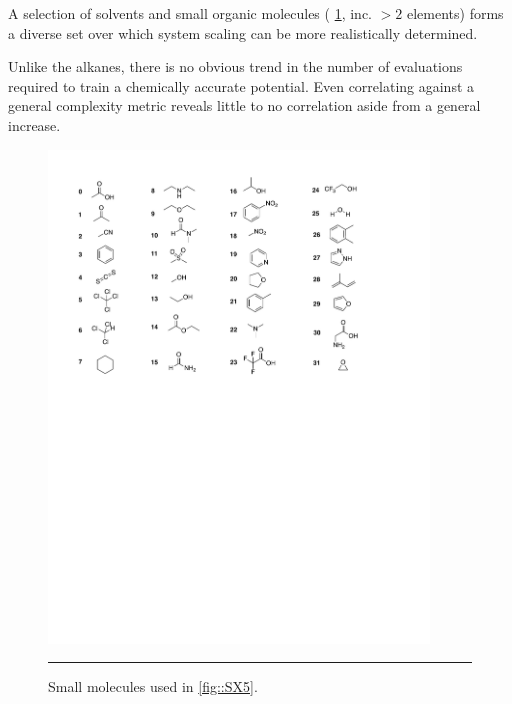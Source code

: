 \documentclass[11pt]{article}
\numberwithin{equation}{subsection}
\begin{document}
A selection of solvents and small organic molecules (\figurename{ \ref{fig::SX4}}, inc. $>2$ elements) forms a diverse set over which system scaling can be more realistically determined. 

Unlike the alkanes, there is no obvious trend in the number of evaluations required to train a chemically accurate potential. Even correlating against a general complexity metric\cite{Bertz1981} reveals little to no correlation aside from a general increase.

\begin{figure}[h!]
	\centering
	\vspace{0.4cm}
	\includegraphics[width=0.9\textwidth]{figSX4.pdf}
	\vspace{0.2cm}
	\hrule
	\vspace{0.1cm}
	\caption{Small molecules used in \figurename{ \ref{fig::SX5}}.}
	\label{fig::SX4}
\end{figure}
\end{document}

